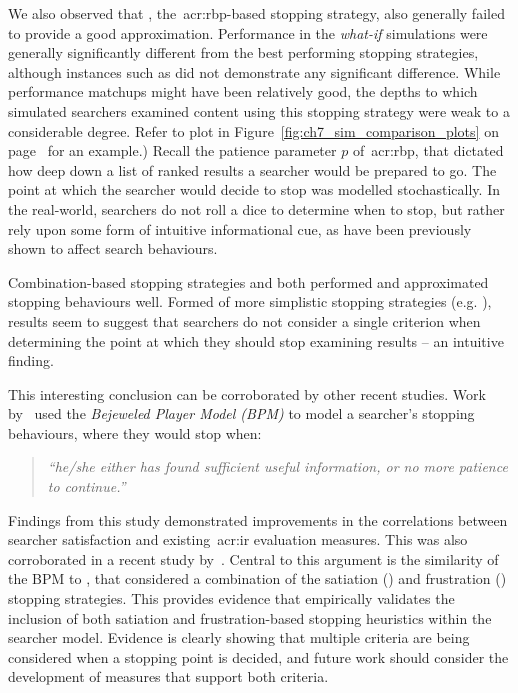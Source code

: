 We also observed that , the~\gls{acr:rbp}-based stopping strategy, also generally failed to provide a good approximation. Performance in the \emph{what-if} simulations were generally significantly different from the best performing stopping strategies, although instances such as  did not demonstrate any significant difference. While performance matchups might have been relatively good, the depths to which simulated searchers examined content using this stopping strategy were weak to a considerable degree. Refer to plot  in Figure~\ref{fig:ch7_sim_comparison_plots} on page~\pageref{fig:ch7_sim_comparison_plots} for an example.) Recall the patience parameter $p$ of~\gls{acr:rbp}, that dictated how deep down a list of ranked results a searcher would be prepared to go. The point at which the searcher would decide to stop was modelled stochastically. In the real-world, searchers do not roll a dice to determine when to stop, but rather rely upon some form of intuitive informational cue, as have been previously shown to affect search behaviours.

Combination-based stopping strategies  and  both performed and approximated stopping behaviours well. Formed of more simplistic stopping strategies (e.g. ), results seem to suggest that searchers do not consider a single criterion when determining the point at which they should stop examining results -- an intuitive finding.

This interesting conclusion can be corroborated by other recent studies. Work by~\cite{zhang2017bejewled} used the \emph{Bejeweled Player Model (BPM)} to model a searcher's stopping behaviours, where they would stop when:

\begin{quote}
    \emph{``he/she either has found sufficient useful information, or no more patience to continue.''}
\end{quote}

Findings from this study demonstrated improvements in the correlations between searcher satisfaction and existing~\gls{acr:ir} evaluation measures. This was also corroborated in a recent study by~\cite{azzopardi2018cwl}. Central to this argument is the similarity of the BPM to , that considered a combination of the satiation () and frustration () stopping strategies. This provides evidence that empirically validates the inclusion of both satiation and frustration-based stopping heuristics within the searcher model. Evidence is clearly showing that multiple criteria are being considered when a stopping point is decided, and future work should consider the development of measures that support both criteria.

